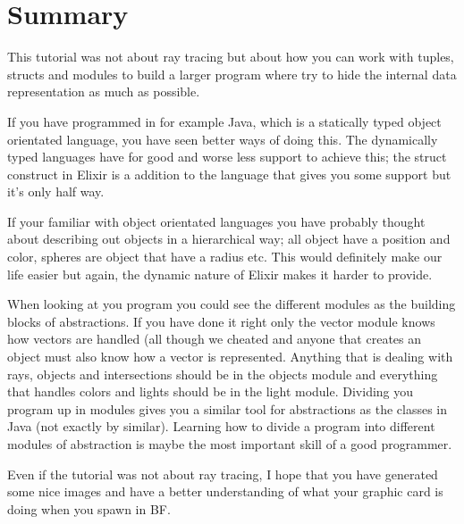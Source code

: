 \documentclass[a4paper,11pt]{article}
\begin{document}

\section{Summary}
This tutorial was not about ray tracing but about how you can work
with tuples, structs and modules to build a larger program where try
to hide the internal data representation as much as possible.

If you have programmed in for example Java, which is a statically typed
object orientated language, you have seen better ways of doing
this. The dynamically typed languages have for good and worse less
support to achieve this; the struct construct in Elixir is a addition
to the language that gives you some support but it's only half way.

If your familiar with object orientated languages you have probably
thought about describing out objects in a hierarchical way; all object
have a position and color, spheres are object that have a radius
etc. This would definitely make our life easier but again, the dynamic
nature of Elixir makes it harder to provide.

When looking at you program you could see the different modules as the
building blocks of abstractions. If you have done it right only the
vector module knows how vectors are handled (all though we cheated
and anyone that creates an object must also know how a vector is
represented. Anything that is dealing with rays, objects and
intersections should be in the objects module and everything that
handles colors and lights should be in the light module. Dividing you
program up in modules gives you a similar tool for abstractions as the
classes in Java (not exactly by similar). Learning how to divide a
program into different modules of abstraction is maybe the most
important skill of a good programmer.

Even if the tutorial was not about ray tracing, I hope that you have
generated some nice images and have a better understanding of what
your graphic card is doing when you spawn in BF.

\newpage
\appendix
\end{document}
